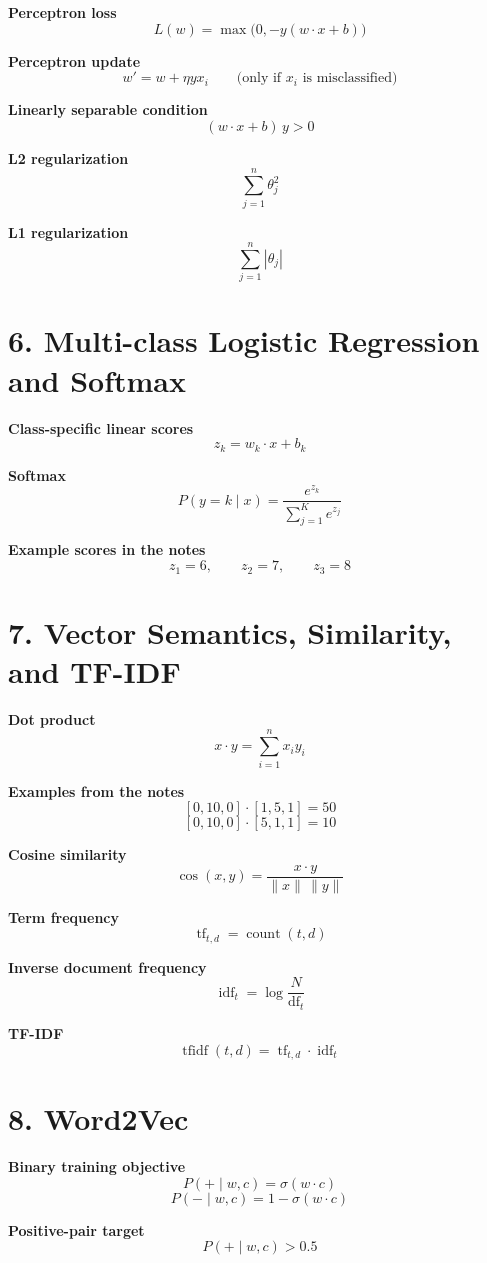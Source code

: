 \documentclass[11pt]{article}
\begin{document}
\textbf{Perceptron loss}
\[
L(w) = \max\bigl(0, -y(w \cdot x + b)\bigr)
\]

\textbf{Perceptron update}
\[
w' = w + \eta y x_i
\qquad \text{(only if }x_i\text{ is misclassified)}
\]

\textbf{Linearly separable condition}
\[
(w \cdot x + b)\, y > 0
\]

\textbf{L2 regularization}
\[
\sum_{j=1}^{n} \theta_j^2
\]

\textbf{L1 regularization}
\[
\sum_{j=1}^{n} |\theta_j|
\]

\section*{6. Multi-class Logistic Regression and Softmax}

\textbf{Class-specific linear scores}
\[
z_k = w_k \cdot x + b_k
\]

\textbf{Softmax}
\[
P(y=k \mid x) = \frac{e^{z_k}}{\sum_{j=1}^{K} e^{z_j}}
\]

\textbf{Example scores in the notes}
\[
z_1 = 6,\qquad z_2 = 7,\qquad z_3 = 8
\]

\section*{7. Vector Semantics, Similarity, and TF-IDF}

\textbf{Dot product}
\[
x \cdot y = \sum_{i=1}^{n} x_i y_i
\]

\textbf{Examples from the notes}
\[
[0, 10, 0] \cdot [1, 5, 1] = 50
\]
\[
[0, 10, 0] \cdot [5, 1, 1] = 10
\]

\textbf{Cosine similarity}
\[
\cos(x, y) = \frac{x \cdot y}{\|x\|\, \|y\|}
\]

\textbf{Term frequency}
\[
\operatorname{tf}_{t,d} = \operatorname{count}(t,d)
\]

\textbf{Inverse document frequency}
\[
\operatorname{idf}_t = \log \frac{N}{\operatorname{df}_t}
\]

\textbf{TF-IDF}
\[
\operatorname{tfidf}(t,d) = \operatorname{tf}_{t,d}\cdot \operatorname{idf}_t
\]

\section*{8. Word2Vec}

\textbf{Binary training objective}
\[
P(+ \mid w, c) = \sigma(w \cdot c)
\]
\[
P(- \mid w, c) = 1 - \sigma(w \cdot c)
\]

\textbf{Positive-pair target}
\[
P(+ \mid w, c) > 0.5
\]
\end{document}

